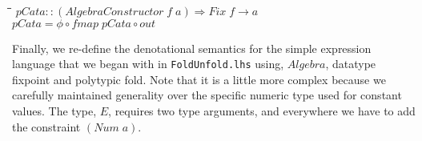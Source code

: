 \documentclass[10pt]{article}
\newlength{\lwidth}\setlength{\lwidth}{4.5cm}
\newlength{\cwidth}\setlength{\cwidth}{8mm} %
\newcommand{\Conid}[1]{\mathit{#1}}
\newcommand{\Varid}[1]{\mathit{#1}}
\begin{document}
\begin{tabbing}
\qquad\=\hspace{\lwidth}\=\hspace{\cwidth}\=\+\kill
${\Varid{pCata}\mathbin{::}(\Conid{AlgebraConstructor}\;\Varid{f}\;\Varid{a})\Rightarrow \Conid{Fix}\;\Varid{f}\to \Varid{a}}$\\
${\Varid{pCata}\mathrel{=}\Varid{\phi}\mathbin{\circ}\Varid{fmap}\;\Varid{pCata}\mathbin{\circ}\Varid{out}}$
\end{tabbing}
Finally, we re-define the denotational semantics for the simple
expression language that we began with in \texttt{FoldUnfold.lhs}
using, \ensuremath{\Conid{Algebra}}, datatype fixpoint and polytypic fold.  Note that it
is a little more complex because we carefully maintained generality
over the specific numeric type used for constant values. The type,
\ensuremath{\Conid{E}}, requires two type arguments, and everywhere we have to add the
constraint \ensuremath{(\Conid{Num}\;\Varid{a})}.
\end{document}
